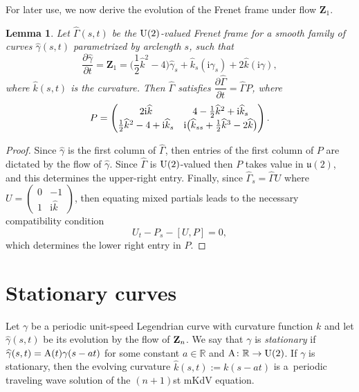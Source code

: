 \documentclass[pdftex]{sigma}
\newcommand\kk{k} %
\def\ri{\mathrm{i}}
\newcommand\VZ{\mathbf Z}
\def\gam{\gamma} %
\def\di{\partial}
\def\R{\mathbb R}
\newcommand\gamf{\widehat{\gam}} %
\newcommand\Gamf{\widehat{\Gamma}} %
\newcommand\kh{\widehat{\kk}} %
\numberwithin{equation}{section}
\newtheorem{Lemma}[Theorem]{Lemma}
\begin{document}
For later use, we now derive the evolution of the Frenet frame under flow $\VZ_1$.

\begin{Lemma}\label{FrenetEvolution} Let $\Gamf(s,t)$ be the ${\rm U}(2)$-valued Frenet frame for a smooth family of curves $\gamf(s,t)$ parametrized
by arclength $s$, such that
\[\dfrac{\di \gamf}{\di t} = \VZ_1 = \biggl(\frac12 \kh^2 -4\biggr) \gamf_s + \kh_s (\ri \gam_s) + 2\kh (\ri \gam),\]
where $\kh(s,t)$ is the curvature. Then $\Gamf$ satisfies $\dfrac{\di \Gamf}{\di t} = \Gamf P$, where
\begin{equation}\label{Z1flowPform}\renewcommand{\arraystretch}{1.2}
P = \begin{pmatrix} 2\ri \kh & 4 - \tfrac12 \kh^2 +\ri \kh_s \\ \tfrac12 \kh^2 -4 + \ri \kh_s & \ri \bigl(\kh_{ss} + \tfrac12\kh^3 -2\kh\bigr) \end{pmatrix}.
\end{equation}
\end{Lemma}
\begin{proof} Since $\gamf$ is the first column of $\Gamf$, then entries of the first column of $P$ are dictated by the flow of $\gamf$.
Since $\Gamf$ is ${\rm U}(2)$-valued then $P$ takes value in ${\mathfrak u}(2)$, and this determines the upper-right entry. Finally,
since $\Gamf_s = \Gamf U$ where $U=\left( \begin{smallmatrix} 0 & -1 \\ 1 & \ri\kh \end{smallmatrix} \right)$, then equating mixed partials leads to the necessary compatibility condition
\[U_t - P_s - [U,P] = 0,\]
which determines the lower right entry in $P$.
\end{proof}

\section{Stationary curves}\label{sec4}
\def\ki{\kk}
\def\gami{\gam}
\def\kf{\kh}

Let $\gami$ be a periodic unit-speed Legendrian curve {with curvature function $\ki$} and let $\gamf(s,t)$ be its evolution by the flow of ${\bf Z}_n$.
We say that $\gami$ is {\it stationary} if $\gamf(s,t)={\rm A}(t)\gami(s-at)$ for some constant $a\in \R$ and ${\rm A}\colon \R\to {\rm U}(2)$.
If $\gami$ is stationary, then the evolving curvature $\kf(s,t):=\ki(s-at)$ is a~periodic traveling wave solution of the $(n+1)$st mKdV equation.
\end{document}
